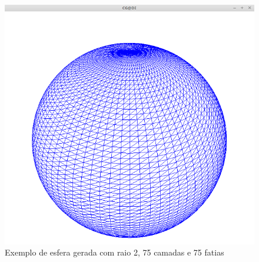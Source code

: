 \begin{figure}[<+htpb+>]
	\centering
	\includegraphics[scale=0.5]{imagens/p3_esfera_2_75_75.png}
	\caption{Exemplo de esfera gerada com raio 2, 75 camadas e 75 fatias}
	\label{p1:fig:p3_esfera_2_20_20}
\end{figure}





